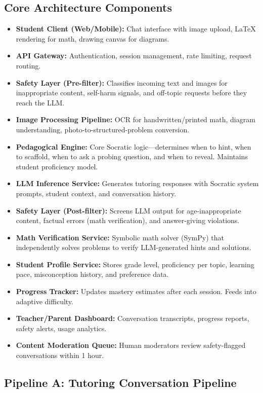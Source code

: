\subsection*{Core Architecture Components}

\begin{itemize}
  \item \textbf{Student Client (Web/Mobile):} Chat interface with image upload, LaTeX rendering for math, drawing canvas for diagrams.
  \item \textbf{API Gateway:} Authentication, session management, rate limiting, request routing.
  \item \textbf{Safety Layer (Pre-filter):} Classifies incoming text and images for inappropriate content, self-harm signals, and off-topic requests before they reach the LLM.
  \item \textbf{Image Processing Pipeline:} OCR for handwritten/printed math, diagram understanding, photo-to-structured-problem conversion.
  \item \textbf{Pedagogical Engine:} Core Socratic logic---determines when to hint, when to scaffold, when to ask a probing question, and when to reveal. Maintains student proficiency model.
  \item \textbf{LLM Inference Service:} Generates tutoring responses with Socratic system prompts, student context, and conversation history.
  \item \textbf{Safety Layer (Post-filter):} Screens LLM output for age-inappropriate content, factual errors (math verification), and answer-giving violations.
  \item \textbf{Math Verification Service:} Symbolic math solver (SymPy) that independently solves problems to verify LLM-generated hints and solutions.
  \item \textbf{Student Profile Service:} Stores grade level, proficiency per topic, learning pace, misconception history, and preference data.
  \item \textbf{Progress Tracker:} Updates mastery estimates after each session. Feeds into adaptive difficulty.
  \item \textbf{Teacher/Parent Dashboard:} Conversation transcripts, progress reports, safety alerts, usage analytics.
  \item \textbf{Content Moderation Queue:} Human moderators review safety-flagged conversations within 1 hour.
\end{itemize}

\subsection*{Pipeline A: Tutoring Conversation Pipeline}

